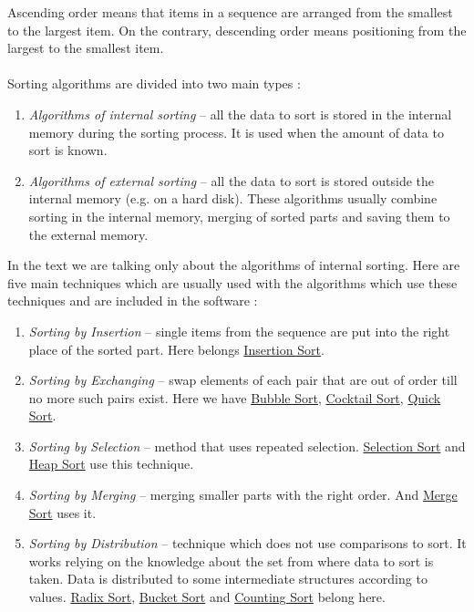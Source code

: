 \documentclass[
  field=inf,
  biblatex,
  language=english,
  glossaries,
  theorems=false,
  sourcecodes=false,
  index
]{kidiplom}
\begin{document}
Ascending order means that items in a sequence are arranged from the smallest to the largest item. On the contrary, descending order means positioning from the largest to the smallest item.
\\\\
Sorting algorithms are divided into two main types \citep{alm2}:
\begin{enumerate}
	\item \textit{Algorithms of internal sorting} -- all the data to sort is stored in the internal memory during the sorting process. It is used when the amount of data to sort is known.
	\item \textit{Algorithms of external sorting} -- all the data to sort is stored outside the internal memory (e.g. on a hard disk). These algorithms usually combine sorting in the internal memory, merging of sorted parts and saving them to the external memory.
\end{enumerate}

In the text we are talking only about the algorithms of internal sorting. Here are five main techniques which are usually used with the algorithms which use these techniques and are included in the software \cite{knuth3}:
\begin{enumerate}
	\item \textit{Sorting by Insertion} -- single items from the sequence are put into the right place of the sorted part. Here belongs \hyperref[sec:insertion]{Insertion Sort}.
	\item \textit{Sorting by Exchanging} -- swap elements of each pair that are out of order till no more such pairs exist. Here we have \hyperref[sec:bubble]{Bubble Sort}, \hyperref[sec:cocktailsort]{Cocktail Sort}, \hyperref[sec:quicksort]{Quick Sort}.
	\item \textit{Sorting by Selection} -- method that uses repeated selection. \hyperref[sec:selection]{Selection Sort} and \hyperref[sec:heapsort]{Heap Sort} use this technique.
	\item \textit{Sorting by Merging} -- merging smaller parts with the right order. And \hyperref[sec:mergesort]{Merge Sort} uses it. 
	\item \textit{Sorting by Distribution} -- technique which does not use comparisons to sort. It works relying on the knowledge about the set from where data to sort is taken. Data is distributed to some intermediate structures according to values. \hyperref[sec:radixsort]{Radix Sort}, \hyperref[sec:bucketsort]{Bucket Sort} and \hyperref[sec:counting]{Counting Sort} belong here.
\end{enumerate}
\end{document}
